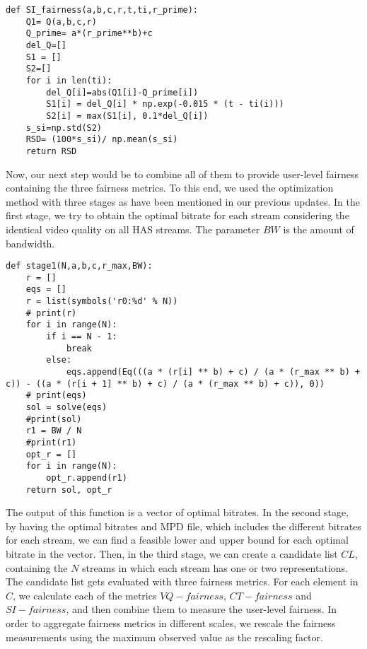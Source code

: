 \documentclass{article}
\begin{document}
\begin{verbatim}
def SI_fairness(a,b,c,r,t,ti,r_prime):
    Q1= Q(a,b,c,r)
    Q_prime= a*(r_prime**b)+c
    del_Q=[]
    S1 = []
    S2=[]
    for i in len(ti):
        del_Q[i]=abs(Q1[i]-Q_prime[i])
        S1[i] = del_Q[i] * np.exp(-0.015 * (t - ti(i)))
        S2[i] = max(S1[i], 0.1*del_Q[i])
    s_si=np.std(S2)
    RSD= (100*s_si)/ np.mean(s_si)
    return RSD
\end{verbatim}

Now, our next step would be to combine all of them to provide user-level fairness containing the three fairness metrics. To this end, we used the optimization method with three stages as have been mentioned in our previous updates. In the first stage, we try to obtain the optimal bitrate for each stream considering the identical video quality on all HAS streams. The parameter $BW$ is the amount of bandwidth. 

\begin{verbatim}
def stage1(N,a,b,c,r_max,BW):
    r = []
    eqs = []
    r = list(symbols('r0:%d' % N))
    # print(r)
    for i in range(N):
        if i == N - 1:
            break
        else:
            eqs.append(Eq(((a * (r[i] ** b) + c) / (a * (r_max ** b) + c)) - ((a * (r[i + 1] ** b) + c) / (a * (r_max ** b) + c)), 0))
    # print(eqs)
    sol = solve(eqs)
    #print(sol)
    r1 = BW / N
    #print(r1)
    opt_r = []
    for i in range(N):
        opt_r.append(r1)
    return sol, opt_r
\end{verbatim}

The output of this function is a vector of optimal bitrates. In the second stage, by having the optimal bitrates and MPD file, which includes the different bitrates for each stream, we can find a feasible lower and upper bound for each optimal bitrate in the vector. Then, in the third stage, we can create a candidate list $CL$, containing the $N$ streams in which each stream has one or two representations. The candidate list gets evaluated with three fairness metrics. For each element in $C$, we calculate each of the metrics $VQ-fairness$, $CT-fairness$ and $SI-fairness$, and then combine them to measure the user-level fairness. In order to aggregate fairness metrics in different scales, we rescale the fairness measurements using the maximum observed value as the rescaling factor.
\end{document}
